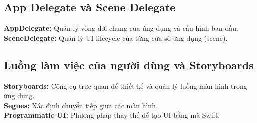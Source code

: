    \subsection{App Delegate và Scene Delegate}	
         \begin{flushleft}
            \textbf{AppDelegate:} Quản lý vòng đời chung của ứng dụng và cấu hình ban đầu.
            \textbf{SceneDelegate:} Quản lý UI lifecycle của từng cửa sổ ứng dụng (scene).
         \end{flushleft}

   \subsection{Luồng làm việc của người dùng và Storyboards}
        \begin{flushleft}
            \textbf{Storyboards:} Công cụ trực quan để thiết kế và quản lý luồng màn hình trong ứng dụng.\\
            \textbf{Segues:} Xác định chuyển tiếp giữa các màn hình.\\
            \textbf{Programmatic UI:} Phương pháp thay thế để tạo UI bằng mã Swift.
        \end{flushleft}